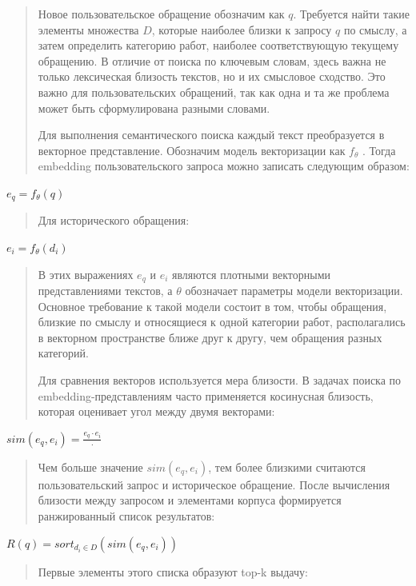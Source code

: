 \documentclass[
]{article}
\begin{document}
\begin{quote}
Новое пользовательское обращение обозначим как \(q\). Требуется найти
такие элементы множества \(D\), которые наиболее близки к запросу \(q\)
по смыслу, а затем определить категорию работ, наиболее соответствующую
текущему обращению. В отличие от поиска по ключевым словам, здесь важна
не только лексическая близость текстов, но и их смысловое сходство. Это
важно для пользовательских обращений, так как одна и та же проблема
может быть сформулирована разными словами.

Для выполнения семантического поиска каждый текст преобразуется в
векторное представление. Обозначим модель векторизации как
\(f_{\theta}\) . Тогда embedding пользовательского запроса можно
записать следующим образом:
\end{quote}

\(e_{q} = f_{\theta}(q)\)

\begin{quote}
Для исторического обращения:
\end{quote}

\(e_{i} = f_{\theta}\left( d_{i} \right)\)

\begin{quote}
В этих выражениях \(e_{q}\) и \(e_{i}\) являются плотными векторными
представлениями текстов, а \(\theta\) обозначает параметры модели
векторизации. Основное требование к такой модели состоит в том, чтобы
обращения, близкие по смыслу и относящиеся к одной категории работ,
располагались в векторном пространстве ближе друг к другу, чем обращения
разных категорий.

Для сравнения векторов используется мера близости. В задачах поиска по
embedding-представлениям часто применяется косинусная близость, которая
оценивает угол между двумя векторами:
\end{quote}

\(sim\left( e_{q},e_{i} \right) = \frac{e_{q} \cdot e_{i}}{\cdot}\)

\begin{quote}
Чем больше значение \(sim\left( e_{q},e_{i} \right)\), тем более
близкими считаются пользовательский запрос и историческое обращение.
После вычисления близости между запросом и элементами корпуса
формируется ранжированный список результатов:
\end{quote}

\(R(q) = sort_{d_{i} \in D}\left( sim\left( e_{q},e_{i} \right) \right)\)

\begin{quote}
Первые элементы этого списка образуют top-k выдачу:
\end{quote}
\end{document}
